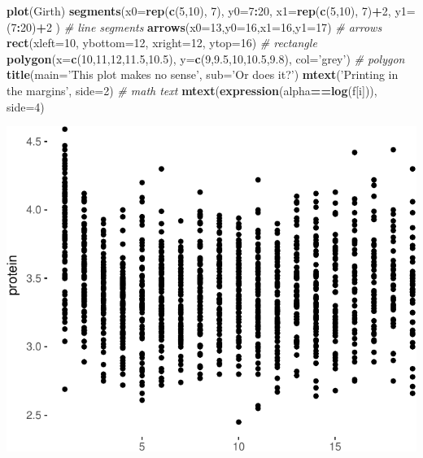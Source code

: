 \documentclass[]{book}
\newenvironment{Shaded}{\begin{snugshade}}{\end{snugshade}}
\newcommand{\KeywordTok}[1]{\textcolor[rgb]{0.13,0.29,0.53}{\textbf{#1}}}
\newcommand{\DataTypeTok}[1]{\textcolor[rgb]{0.13,0.29,0.53}{#1}}
\newcommand{\DecValTok}[1]{\textcolor[rgb]{0.00,0.00,0.81}{#1}}
\newcommand{\FloatTok}[1]{\textcolor[rgb]{0.00,0.00,0.81}{#1}}
\newcommand{\StringTok}[1]{\textcolor[rgb]{0.31,0.60,0.02}{#1}}
\newcommand{\CommentTok}[1]{\textcolor[rgb]{0.56,0.35,0.01}{\textit{#1}}}
\newcommand{\OperatorTok}[1]{\textcolor[rgb]{0.81,0.36,0.00}{\textbf{#1}}}
\newcommand{\NormalTok}[1]{#1}
\theoremstyle{definition}
\theoremstyle{definition}
\theoremstyle{definition}
\theoremstyle{remark}
\begin{document}
\begin{Shaded}
\begin{Highlighting}[]
\KeywordTok{plot}\NormalTok{(Girth)}
\KeywordTok{segments}\NormalTok{(}\DataTypeTok{x0=}\KeywordTok{rep}\NormalTok{(}\KeywordTok{c}\NormalTok{(}\DecValTok{5}\NormalTok{,}\DecValTok{10}\NormalTok{), }\DecValTok{7}\NormalTok{), }\DataTypeTok{y0=}\DecValTok{7}\OperatorTok{:}\DecValTok{20}\NormalTok{, }\DataTypeTok{x1=}\KeywordTok{rep}\NormalTok{(}\KeywordTok{c}\NormalTok{(}\DecValTok{5}\NormalTok{,}\DecValTok{10}\NormalTok{), }\DecValTok{7}\NormalTok{)}\OperatorTok{+}\DecValTok{2}\NormalTok{, }\DataTypeTok{y1=}\NormalTok{(}\DecValTok{7}\OperatorTok{:}\DecValTok{20}\NormalTok{)}\OperatorTok{+}\DecValTok{2}\NormalTok{ ) }\CommentTok{# line segments}
\KeywordTok{arrows}\NormalTok{(}\DataTypeTok{x0=}\DecValTok{13}\NormalTok{,}\DataTypeTok{y0=}\DecValTok{16}\NormalTok{,}\DataTypeTok{x1=}\DecValTok{16}\NormalTok{,}\DataTypeTok{y1=}\DecValTok{17}\NormalTok{) }\CommentTok{# arrows}
\KeywordTok{rect}\NormalTok{(}\DataTypeTok{xleft=}\DecValTok{10}\NormalTok{, }\DataTypeTok{ybottom=}\DecValTok{12}\NormalTok{,  }\DataTypeTok{xright=}\DecValTok{12}\NormalTok{, }\DataTypeTok{ytop=}\DecValTok{16}\NormalTok{) }\CommentTok{# rectangle}
\KeywordTok{polygon}\NormalTok{(}\DataTypeTok{x=}\KeywordTok{c}\NormalTok{(}\DecValTok{10}\NormalTok{,}\DecValTok{11}\NormalTok{,}\DecValTok{12}\NormalTok{,}\FloatTok{11.5}\NormalTok{,}\FloatTok{10.5}\NormalTok{), }\DataTypeTok{y=}\KeywordTok{c}\NormalTok{(}\DecValTok{9}\NormalTok{,}\FloatTok{9.5}\NormalTok{,}\DecValTok{10}\NormalTok{,}\FloatTok{10.5}\NormalTok{,}\FloatTok{9.8}\NormalTok{), }\DataTypeTok{col=}\StringTok{'grey'}\NormalTok{) }\CommentTok{# polygon}
\KeywordTok{title}\NormalTok{(}\DataTypeTok{main=}\StringTok{'This plot makes no sense'}\NormalTok{, }\DataTypeTok{sub=}\StringTok{'Or does it?'}\NormalTok{) }
\KeywordTok{mtext}\NormalTok{(}\StringTok{'Printing in the margins'}\NormalTok{, }\DataTypeTok{side=}\DecValTok{2}\NormalTok{) }\CommentTok{# math text}
\KeywordTok{mtext}\NormalTok{(}\KeywordTok{expression}\NormalTok{(alpha}\OperatorTok{==}\KeywordTok{log}\NormalTok{(f[i])), }\DataTypeTok{side=}\DecValTok{4}\NormalTok{)}
\end{Highlighting}
\end{Shaded}

\includegraphics[width=0.5\linewidth]{Rcourse_files/figure-latex/unnamed-chunk-248-1}
\end{document}
